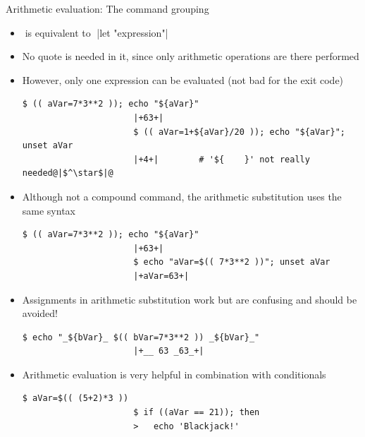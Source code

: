 \begin{frame}[fragile]{Arithmetic evaluation: The command grouping \PB{\texttt{((\ldots))}}}
    \begin{overlayarea}{\textwidth}{0.7\textheight}
        \begin{itemize}
            \item<only@1>  $\;$is  equivalent to$\;$ \bash|let "expression"|
            \item<only@1> No quote is needed in it, since only arithmetic operations are there performed
            \item<only@1> However, only one expression can be evaluated (not bad for the exit code)
                  \begin{lstlisting}[style=MyBash, style=oddnumbers, aboveskip=2mm, belowskip=-6mm]
                      $ (( aVar=7*3**2 )); echo "${aVar}"
                      |+63+|
                      $ (( aVar=1+${aVar}/20 )); echo "${aVar}"; unset aVar
                      |+4+|        # '${    }' not really needed@|$^\star$|@
                  \end{lstlisting}
            \item<only@1> Although not a compound command, the arithmetic substitution uses the same syntax
                  \begin{lstlisting}[style=MyBash, style=oddnumbers, aboveskip=2mm, belowskip=-6mm, firstnumber=4]
                      $ (( aVar=7*3**2 )); echo "${aVar}"
                      |+63+|
                      $ echo "aVar=$(( 7*3**2 ))"; unset aVar
                      |+aVar=63+|
                  \end{lstlisting}
            \item<only@1> Assignments in arithmetic substitution work but are confusing and should be avoided!
                  \begin{lstlisting}[style=MyBash, style=oddnumbers, aboveskip=2mm, belowskip=-6mm, firstnumber=8]
                      $ echo "_${bVar}_ $(( bVar=7*3**2 )) _${bVar}_"
                      |+__ 63 _63_+|
                  \end{lstlisting}
            \item<only@2> Arithmetic evaluation is very helpful in combination with conditionals
                  \begin{lstlisting}[style=MyBash, aboveskip=2mm, belowskip=-6mm, firstnumber=11]
                      $ aVar=$(( (5+2)*3 ))
                      $ if ((aVar == 21)); then
                      >   echo 'Blackjack!'

\end{lstlisting}
\end{itemize}
\end{overlayarea}
\end{frame}
